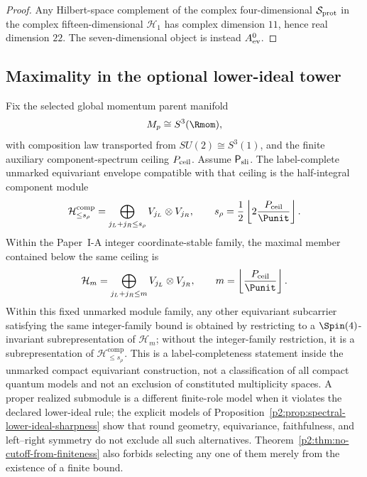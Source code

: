 \documentclass[11pt,a4paper]{article}
\begin{document}
\begin{proof}
Any Hilbert-space complement of the complex four-dimensional
\(\mathcal S_{\rm prot}\) in the complex fifteen-dimensional \(\mathcal H_1\) has
complex dimension \(11\), hence real dimension \(22\).  The
seven-dimensional object is instead \(A_{\rm ev}^{0}\).
\end{proof}

\subsection{Maximality in the optional lower-ideal tower}
\label{p2b:app:lower-ideal-maximality}
\begin{theorem}
\label{p2:thm:uniqueness}
Fix the selected global momentum parent manifold
\[
M_p\cong S^3(\Rmom),
\]
with composition law transported from $SU(2)\cong S^3(1)$, and the finite
auxiliary component-spectrum ceiling \(P_{\rm ceil}\).  Assume
\(\mathsf P_{\rm sli}\).
The label-complete unmarked equivariant envelope compatible with that
ceiling is the half-integral component module
\[
\mathcal H_{\le s_\rho}^{\mathrm{comp}}
=\bigoplus_{j_L+j_R\le s_\rho}V_{j_L}\otimes V_{j_R},
\qquad
s_\rho=\frac12\left\lfloor2\frac{P_{\rm ceil}}{\Punit}\right\rfloor.
\]
Within the Paper~I-A integer coordinate-stable family, the maximal member contained below the same ceiling is
\[
\mathcal H_m=\bigoplus_{j_L+j_R\le m}V_{j_L}\otimes V_{j_R},
\qquad
m=\left\lfloor\frac{P_{\rm ceil}}{\Punit}\right\rfloor.
\]
Within this fixed unmarked module family, any other equivariant subcarrier
satisfying the same integer-family bound is obtained by restricting to a
$\Spin(4)$-invariant subrepresentation of \(\mathcal H_m\); without the
integer-family restriction, it is a subrepresentation of
\(\mathcal H_{\le s_\rho}^{\mathrm{comp}}\). This is a label-completeness
statement inside the unmarked compact equivariant construction, not a
classification of all compact quantum models and not an exclusion of
constituted multiplicity spaces.  A proper realized submodule is a different
finite-role model when it violates the declared lower-ideal rule; the explicit
models of Proposition~\ref{p2:prop:spectral-lower-ideal-sharpness} show that
round geometry, equivariance, faithfulness, and left--right symmetry do not
exclude all such alternatives.  Theorem~\ref{p2:thm:no-cutoff-from-finiteness}
also forbids selecting any one of them merely from the existence of a finite
bound.
\end{theorem}
\end{document}
